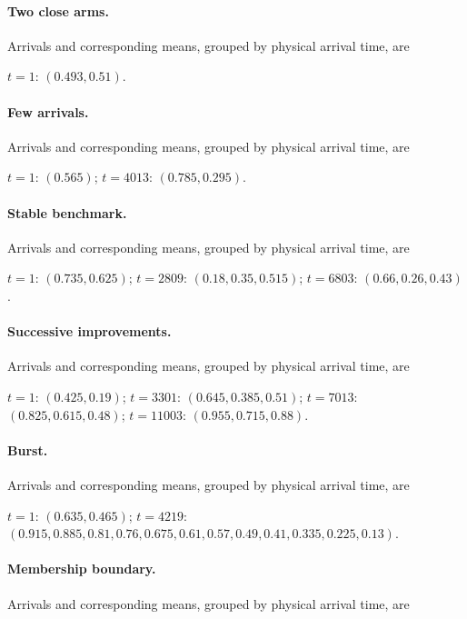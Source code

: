\documentclass[11pt]{article}
\theoremstyle{remark}
\begin{document}
\paragraph{Two close arms.} Arrivals and corresponding means, grouped by physical arrival time, are

$t=1$: $(0.493,\allowbreak 0.51)$.

\paragraph{Few arrivals.} Arrivals and corresponding means, grouped by physical arrival time, are

$t=1$: $(0.565)$; $t=4013$: $(0.785,\allowbreak 0.295)$.

\paragraph{Stable benchmark.} Arrivals and corresponding means, grouped by physical arrival time, are

$t=1$: $(0.735,\allowbreak 0.625)$; $t=2809$: $(0.18,\allowbreak 0.35,\allowbreak 0.515)$; $t=6803$: $(0.66,\allowbreak 0.26,\allowbreak 0.43)$.

\paragraph{Successive improvements.} Arrivals and corresponding means, grouped by physical arrival time, are

$t=1$: $(0.425,\allowbreak 0.19)$; $t=3301$: $(0.645,\allowbreak 0.385,\allowbreak 0.51)$; $t=7013$: $(0.825,\allowbreak 0.615,\allowbreak 0.48)$; $t=11003$: $(0.955,\allowbreak 0.715,\allowbreak 0.88)$.

\paragraph{Burst.} Arrivals and corresponding means, grouped by physical arrival time, are

$t=1$: $(0.635,\allowbreak 0.465)$; $t=4219$: $(0.915,\allowbreak 0.885,\allowbreak 0.81,\allowbreak 0.76,\allowbreak 0.675,\allowbreak 0.61,\allowbreak 0.57,\allowbreak 0.49,\allowbreak 0.41,\allowbreak 0.335,\allowbreak 0.225,\allowbreak 0.13)$.

\paragraph{Membership boundary.} Arrivals and corresponding means, grouped by physical arrival time, are
\end{document}
